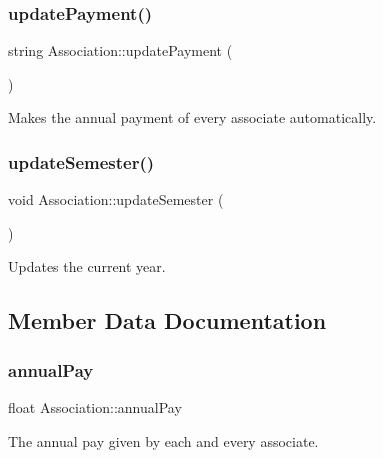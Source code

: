 \subsubsection{\texorpdfstring{update\+Payment()}{updatePayment()}}
{\footnotesize\ttfamily string Association\+::update\+Payment (\begin{DoxyParamCaption}{ }\end{DoxyParamCaption})}



Makes the annual payment of every associate automatically. 

\mbox{\label{classAssociation_aa018edd1d345ca144f648096df9e9bf4}} 
\subsubsection{\texorpdfstring{update\+Semester()}{updateSemester()}}
{\footnotesize\ttfamily void Association\+::update\+Semester (\begin{DoxyParamCaption}{ }\end{DoxyParamCaption})}



Updates the current year. 



\subsection{Member Data Documentation}
\mbox{\label{classAssociation_a19f8a7aad1491bc14f558b0b852da0a4}} 
\subsubsection{\texorpdfstring{annual\+Pay}{annualPay}}
{\footnotesize\ttfamily float Association\+::annual\+Pay\hspace{0.3cm}{\ttfamily [private]}}



The annual pay given by each and every associate. 

\mbox{\label{classAssociation_a6e0125297a1927aae76d14710fc02862}} 
